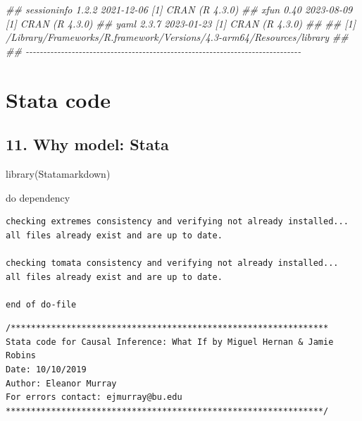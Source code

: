 \documentclass[
  10pt,
  a4paper,
]{book}
\newenvironment{Shaded}{\begin{snugshade}}{\end{snugshade}}
\newcommand{\DocumentationTok}[1]{\textcolor[rgb]{0.37,0.37,0.37}{\textit{#1}}}
\newcommand{\FunctionTok}[1]{\textcolor[rgb]{0.28,0.35,0.67}{#1}}
\newcommand{\KeywordTok}[1]{\textcolor[rgb]{0.00,0.46,0.62}{#1}}
\newcommand{\NormalTok}[1]{\textcolor[rgb]{0.00,0.46,0.62}{#1}}
\begin{document}
\begin{Shaded}
\begin{Highlighting}[]
\DocumentationTok{\#\#  sessioninfo   1.2.2   2021{-}12{-}06 [1] CRAN (R 4.3.0)}
\DocumentationTok{\#\#  xfun          0.40    2023{-}08{-}09 [1] CRAN (R 4.3.0)}
\DocumentationTok{\#\#  yaml          2.3.7   2023{-}01{-}23 [1] CRAN (R 4.3.0)}
\DocumentationTok{\#\# }
\DocumentationTok{\#\#  [1] /Library/Frameworks/R.framework/Versions/4.3{-}arm64/Resources/library}
\DocumentationTok{\#\# }
\DocumentationTok{\#\# {-}{-}{-}{-}{-}{-}{-}{-}{-}{-}{-}{-}{-}{-}{-}{-}{-}{-}{-}{-}{-}{-}{-}{-}{-}{-}{-}{-}{-}{-}{-}{-}{-}{-}{-}{-}{-}{-}{-}{-}{-}{-}{-}{-}{-}{-}{-}{-}{-}{-}{-}{-}{-}{-}{-}{-}{-}{-}{-}{-}{-}{-}{-}{-}{-}{-}{-}{-}{-}{-}{-}{-}{-}{-}{-}{-}{-}{-}}
\end{Highlighting}
\end{Shaded}

\hypertarget{part-stata-code}{%
\part*{Stata code}\label{part-stata-code}}

\hypertarget{why-model-stata}{%
\chapter*{11. Why model: Stata}\label{why-model-stata}}

\begin{Shaded}
\begin{Highlighting}[]
\FunctionTok{library}\NormalTok{(Statamarkdown)}
\end{Highlighting}
\end{Shaded}

\begin{Shaded}
\begin{Highlighting}[]
\KeywordTok{do}\NormalTok{ dependency}
\end{Highlighting}
\end{Shaded}

\begin{verbatim}
checking extremes consistency and verifying not already installed...
all files already exist and are up to date.

checking tomata consistency and verifying not already installed...
all files already exist and are up to date.

end of do-file
\end{verbatim}

\begin{verbatim}
/***************************************************************
Stata code for Causal Inference: What If by Miguel Hernan & Jamie Robins
Date: 10/10/2019
Author: Eleanor Murray 
For errors contact: ejmurray@bu.edu
***************************************************************/
\end{verbatim}
\end{document}

